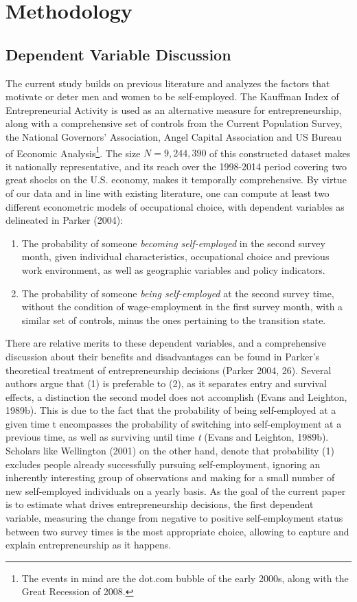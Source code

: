 \chapter{Methodology\label{ch:methods}}


\section {Dependent Variable Discussion}

The current study builds on previous literature and analyzes the factors that motivate or deter men and women to be self-employed. The Kauffman Index of Entrepreneurial Activity is used as an alternative measure for entrepreneurship, along with a comprehensive set of controls from the Current Population Survey, the National Governors' Association,  Angel Capital Association and US Bureau of Economic Analysis\footnote{The events in mind are the dot.com bubble of the early 2000s, along with the Great Recession of 2008.}. The size $N = 9,244,390$ of this constructed dataset makes it nationally representative, and its reach over the 1998-2014 period covering two great shocks on the U.S. economy, makes it temporally comprehensive. By virtue of our data and in line with existing literature, one can compute at least two different econometric models of occupational choice, with dependent variables as delineated in Parker (2004): 
\begin{enumerate}
\item The probability of someone \textit{becoming self-employed} in the second survey month, given individual characteristics, occupational choice and previous work environment, as well as geographic variables and policy indicators.
\item The probability of someone \textit{being self-employed} at the second survey time, without the condition of wage-employment in the first survey month, with a similar set of controls, minus the ones pertaining to the transition state. 
\end{enumerate}
There are relative merits to these dependent variables, and a comprehensive discussion about their benefits and disadvantages can be found in Parker's theoretical treatment of entrepreneurship decisions (Parker 2004, 26). Several authors argue that (1) is preferable to (2), as it separates entry and survival effects, a distinction the second model does not accomplish (Evans and Leighton, 1989b). This is due to the fact that the probability of being self-employed at a given time t encompasses the probability of switching into self-employment at a previous time, as well as surviving until time \textit{t} (Evans and Leighton, 1989b). Scholars like Wellington (2001) on the other hand, denote that probability (1) excludes people already successfully pursuing self-employment, ignoring an inherently interesting group of observations and making for a small number of new self-employed individuals on a yearly basis. As the goal of the current paper is to estimate what drives entrepreneurship decisions, the first dependent variable, measuring the change from negative to positive self-employment status between two survey times is the most appropriate choice, allowing to capture and explain entrepreneurship as it happens. 


